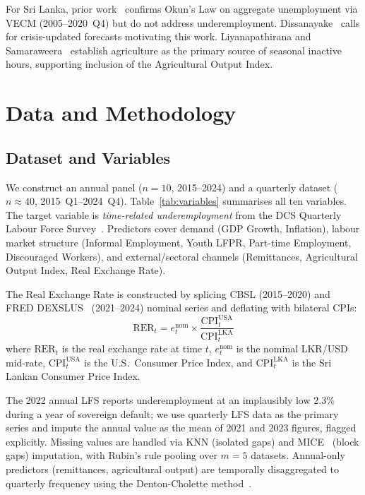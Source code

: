 \documentclass[conference]{IEEEtran}
\begin{document}
For Sri Lanka, prior work~\cite{pabasara2025impact} confirms Okun's
Law on aggregate unemployment via VECM (2005--2020~Q4) but do not address
underemployment. Dissanayake~\cite{dissanayake2026} calls for crisis-updated
forecasts motivating this work. Liyanapathirana and
Samaraweera~\cite{perera2022} establish agriculture as the primary source
of seasonal inactive hours, supporting inclusion of the Agricultural
Output Index.

\section{Data and Methodology}

\subsection{Dataset and Variables}

We construct an annual panel ($n{=}10$, 2015--2024) and a quarterly
dataset ($n{\approx}40$, 2015~Q1--2024~Q4). Table~\ref{tab:variables}
summarises all ten variables. The target variable is \emph{time-related
underemployment} from the DCS Quarterly Labour Force Survey~\cite{dcs2025}.
Predictors cover demand (GDP Growth, Inflation), labour market structure
(Informal Employment, Youth LFPR, Part-time Employment, Discouraged
Workers), and external/sectoral channels (Remittances, Agricultural
Output Index, Real Exchange Rate).

The Real Exchange Rate is constructed by splicing CBSL (2015--2020) and
FRED DEXSLUS~\cite{cbsl2025,fred2025} (2021--2024) nominal series and
deflating with bilateral CPIs:
%
\begin{equation}
  \text{RER}_t = e_t^{\text{nom}} \times
  \frac{\text{CPI}_t^{\text{USA}}}{\text{CPI}_t^{\text{LKA}}}
  \label{eq:rer}
\end{equation}
%
\noindent where $\text{RER}_t$ is the real exchange rate at time $t$,
$e_t^{\text{nom}}$ is the nominal LKR/USD mid-rate,
$\text{CPI}_t^{\text{USA}}$ is the U.S.\ Consumer Price Index, and
$\text{CPI}_t^{\text{LKA}}$ is the Sri Lankan Consumer Price Index.

The 2022 annual LFS reports underemployment at an implausibly low 2.3\%
during a year of sovereign default; we use quarterly LFS data as the
primary series and impute the annual value as the mean of 2021 and 2023
figures, flagged explicitly. Missing values are handled via KNN
(isolated gaps) and MICE~\cite{vanbuuren2018} (block gaps) imputation,
with Rubin's rule pooling over $m{=}5$ datasets. Annual-only predictors
(remittances, agricultural output) are temporally disaggregated to
quarterly frequency using the Denton-Cholette method~\cite{denton1971}.
\end{document}
